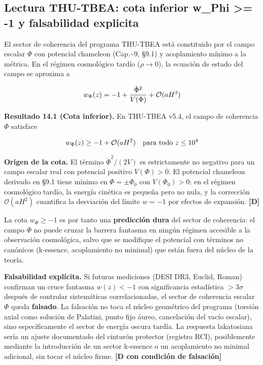 ﻿\documentclass[11pt,letterpaper]{article}
\begin{document}
\subsection{Lectura THU-TBEA: cota inferior w\_Phi >= -1 y falsabilidad explicita}
El sector de coherencia del programa THU-TBEA está constituido por el campo escalar $\Phi$ con potencial chameleon (Cap.\textasciitilde{}9, §9.1) y acoplamiento mínimo a la métrica. En el régimen cosmológico tardío ($\rho \to 0$), la ecuación de estado del campo se aproxima a

\begin{equation*}
  \resizebox{\ifdim\width>\linewidth \linewidth\else\width\fi}{!}{$\displaystyle w_\Phi(z) = -1 + \frac{\dot\Phi^2}{V(\Phi)} + \mathcal{O}(aH^2)$}
\end{equation*}

\textbf{Resultado 14.1 (Cota inferior).} En THU-TBEA v5.4, el campo de coherencia $\Phi$ satisface

\begin{equation*}
  \resizebox{\ifdim\width>\linewidth \linewidth\else\width\fi}{!}{$\displaystyle w_\Phi(z) \geq -1 + \mathcal{O}(aH^2) \quad \text{para todo } z \leq 10^4$}
\end{equation*}

\textbf{Origen de la cota.} El término $\dot\Phi^2/(2V)$ es estrictamente no negativo para un campo escalar real con potencial positivo $V(\Phi) > 0$. El potencial chameleon derivado en §9.1 tiene mínimo en $\Phi = \pm\Phi_0$ con $V(\Phi_0) > 0$; en el régimen cosmológico tardío, la energía cinética es pequeña pero no nula, y la corrección $\mathcal{O}(aH^2)$ cuantifica la desviación del límite $w = -1$ por efectos de expansión. \textbf{[D]}

La cota $w_\Phi \geq -1$ es por tanto una \textbf{predicción dura} del sector de coherencia: el campo $\Phi$ no puede cruzar la barrera fantasma en ningún régimen accesible a la observación cosmológica, salvo que se modifique el potencial con términos no canónicos (k-essence, acoplamiento no minimal) que están fuera del núcleo de la teoría.

\textbf{Falsabilidad explícita.} Si futuras mediciones (DESI DR3, Euclid, Roman) confirman un cruce fantasma $w(z) < -1$ con significancia estadística $> 3\sigma$ después de controlar sistemáticas correlacionadas, el sector de coherencia escalar $\Phi$ queda \textbf{falsado}. La falsación no toca el núcleo geométrico del programa (torsión axial como solución de Palatini, punto fijo áureo, cancelación del vacío escalar), sino específicamente el sector de energía oscura tardía. La respuesta lakatosiana sería un ajuste documentado del cinturón protector (registro RCI), posiblemente mediante la introducción de un sector k-essence o un acoplamiento no minimal adicional, sin tocar el núcleo firme. \textbf{[D con condición de falsación]}
\end{document}
